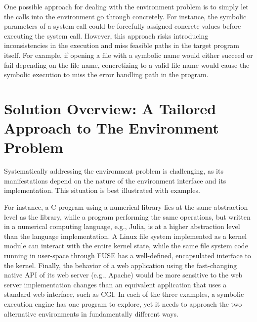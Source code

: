 One possible approach for dealing with the environment problem is to simply let the calls into the environment go through concretely.  For instance, the symbolic parameters of a system call could be forcefully assigned concrete values before executing the system call.
%
However, this approach risks introducing inconsistencies in the execution and miss feasible paths in the target program itself.
%
For example, if opening a file with a symbolic name would either succeed or fail depending on the file name, concretizing to a valid file name would cause the symbolic execution to miss the error handling path in the program.



\section{Solution Overview: A Tailored Approach to The Environment Problem}


Systematically addressing the environment problem is challenging, as its manifestations depend on the nature of the environment interface and its implementation.  This situation is best illustrated with examples.

For instance, a C program using a numerical library lies at the same abstraction level as the library, while a program performing the same operations, but written in a numerical computing language, e.g., Julia, is at a higher abstraction level than the language implementation.
%
A Linux file system implemented as a kernel module can interact with the entire kernel state, while the same file system code running in user-space through FUSE has a well-defined, encapsulated interface to the kernel.
%
Finally, the behavior of a web application using the fast-changing native API of its web server (e.g., Apache) would be more sensitive to the web server implementation changes than an equivalent application that uses a standard web interface, such as CGI.
%
In each of the three examples, a symbolic execution engine has one program to explore, yet it needs to approach the two alternative environments in fundamentally different ways.

